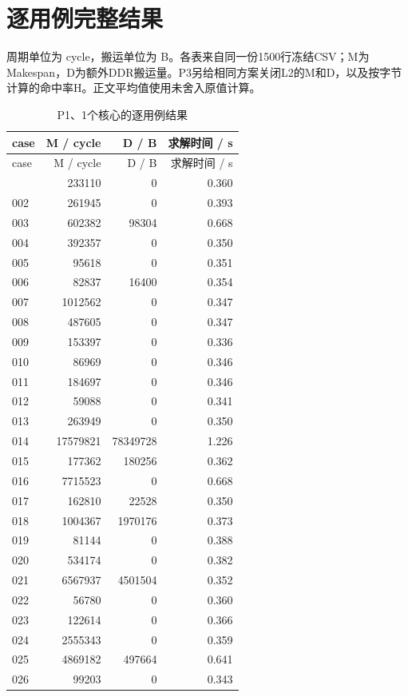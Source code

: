 \documentclass[anonymous,notoc]{gmcm2026}
\begin{document}
\pagestyle{plain}
\section{逐用例完整结果}
周期单位为 cycle，搬运单位为 B。各表来自同一份1500行冻结CSV；M为Makespan，D为额外DDR搬运量。P3另给相同方案关闭L2的M和D，以及按字节计算的命中率H。正文平均值使用未舍入原值计算。

\begin{longtable}{lrrr}
\caption{P1、1个核心的逐用例结果}\\
\toprule
case & M / cycle & D / B & 求解时间 / s\\\midrule
\endfirsthead
\toprule
case & M / cycle & D / B & 求解时间 / s\\\midrule
\endhead
\bottomrule\endfoot
001 & 233110 & 0 & 0.360 \\
002 & 261945 & 0 & 0.393 \\
003 & 602382 & 98304 & 0.668 \\
004 & 392357 & 0 & 0.350 \\
005 & 95618 & 0 & 0.351 \\
006 & 82837 & 16400 & 0.354 \\
007 & 1012562 & 0 & 0.347 \\
008 & 487605 & 0 & 0.347 \\
009 & 153397 & 0 & 0.336 \\
010 & 86969 & 0 & 0.346 \\
011 & 184697 & 0 & 0.346 \\
012 & 59088 & 0 & 0.341 \\
013 & 263949 & 0 & 0.350 \\
014 & 17579821 & 78349728 & 1.226 \\
015 & 177362 & 180256 & 0.362 \\
016 & 7715523 & 0 & 0.668 \\
017 & 162810 & 22528 & 0.350 \\
018 & 1004367 & 1970176 & 0.373 \\
019 & 81144 & 0 & 0.388 \\
020 & 534174 & 0 & 0.382 \\
021 & 6567937 & 4501504 & 0.352 \\
022 & 56780 & 0 & 0.360 \\
023 & 122614 & 0 & 0.366 \\
024 & 2555343 & 0 & 0.359 \\
025 & 4869182 & 497664 & 0.641 \\
026 & 99203 & 0 & 0.343 \\

\end{longtable}
\end{document}
